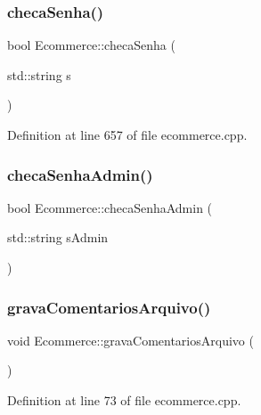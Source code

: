 \subsubsection{\texorpdfstring{checa\+Senha()}{checaSenha()}}
{\footnotesize\ttfamily bool Ecommerce\+::checa\+Senha (\begin{DoxyParamCaption}\item[{std\+::string}]{s }\end{DoxyParamCaption})}



Definition at line 657 of file ecommerce.\+cpp.

\mbox{\label{class_ecommerce_ad3c6b34226cd0d1ab54ec0e6d82a70be}} 
\subsubsection{\texorpdfstring{checa\+Senha\+Admin()}{checaSenhaAdmin()}}
{\footnotesize\ttfamily bool Ecommerce\+::checa\+Senha\+Admin (\begin{DoxyParamCaption}\item[{std\+::string}]{s\+Admin }\end{DoxyParamCaption})}

\mbox{\label{class_ecommerce_aa125d7cab07fec0048b3674f507f60de}} 
\subsubsection{\texorpdfstring{grava\+Comentarios\+Arquivo()}{gravaComentariosArquivo()}}
{\footnotesize\ttfamily void Ecommerce\+::grava\+Comentarios\+Arquivo (\begin{DoxyParamCaption}{ }\end{DoxyParamCaption})}



Definition at line 73 of file ecommerce.\+cpp.

\mbox{\label{class_ecommerce_a8fe170fb0d8cefcbdb82d7ac0e457927}} 
